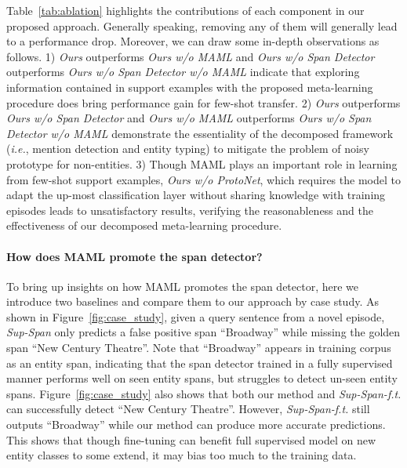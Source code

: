 \documentclass[11pt]{article}
\newcommand\ie{\textit{i.e.}}
\begin{document}
Table~\ref{tab:ablation} highlights the contributions of each component in our proposed approach.
Generally speaking, removing any of them will generally lead to a performance drop.
Moreover, we can draw some in-depth observations as follows.
1) \textit{Ours} outperforms \textit{Ours w/o MAML} and \textit{Ours w/o Span Detector} outperforms \textit{Ours w/o Span Detector w/o MAML} indicate that exploring information contained in support examples with the proposed meta-learning procedure does bring performance gain for few-shot transfer.
2) \textit{Ours} outperforms \textit{Ours w/o Span Detector} and \textit{Ours w/o MAML} outperforms \textit{Ours w/o Span Detector w/o MAML} demonstrate the essentiality of the decomposed framework (\ie, mention detection and entity typing) to mitigate the problem of noisy prototype for non-entities.
3) Though MAML plays an important role in learning from few-shot support examples, 
\textit{Ours w/o ProtoNet}, which requires the model to adapt the up-most classification layer without sharing knowledge with training episodes leads to unsatisfactory results, verifying the reasonableness and the effectiveness of our decomposed meta-learning procedure.



\paragraph{How does MAML promote the span detector?}
To bring up insights on how MAML promotes the span detector, here we introduce two baselines and compare them to our approach by case study. 
As shown in Figure~\ref{fig:case_study},  given a query sentence from a novel episode, \textit{Sup-Span} only predicts a false positive span ``Broadway'' while missing the golden span ``New Century Theatre''.
Note that ``Broadway'' appears in training corpus as an entity span, indicating that the span detector trained in a fully supervised manner performs well on seen entity spans, but struggles to detect un-seen entity spans.
Figure~\ref{fig:case_study} also shows that both our method and \textit{Sup-Span-f.t.} can successfully detect ``New Century Theatre''.
However, \textit{Sup-Span-f.t.} still outputs ``Broadway'' while our method can produce more accurate predictions.
This shows that though fine-tuning can benefit full supervised model on new entity classes to some extend, it may bias too much to the training data.
\end{document}
